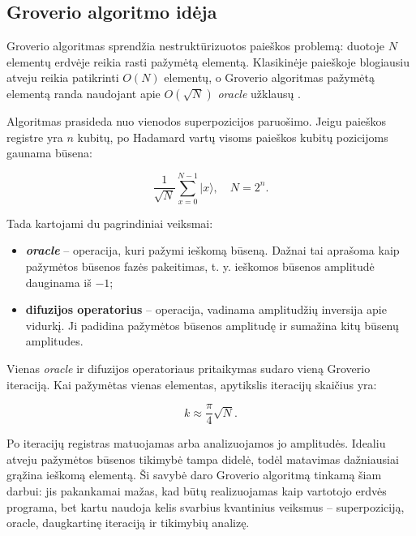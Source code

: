 \subsection{Groverio algoritmo idėja}
\label{sec:groverio-algoritmo-ideja}

Groverio algoritmas sprendžia nestruktūrizuotos paieškos problemą: duotoje $N$ elementų erdvėje reikia rasti pažymėtą elementą. Klasikinėje paieškoje blogiausiu atveju reikia patikrinti $O(N)$ elementų, o Groverio algoritmas pažymėtą elementą randa naudojant apie $O(\sqrt{N})$ \textit{oracle} užklausų \cite{grover-1996,nielsen-chuang-2010}.

Algoritmas prasideda nuo vienodos superpozicijos paruošimo. Jeigu paieškos registre yra $n$ kubitų, po Hadamard vartų visoms paieškos kubitų pozicijoms gaunama būsena:

\begin{equation}
    \frac{1}{\sqrt{N}} \sum_{x=0}^{N-1} \lvert x \rangle,
    \quad N = 2^n.
\end{equation}

Tada kartojami du pagrindiniai veiksmai:

\begin{itemize}
    \item \textbf{\textit{oracle}} -- operacija, kuri pažymi ieškomą būseną. Dažnai tai aprašoma kaip pažymėtos būsenos fazės pakeitimas, t. y. ieškomos būsenos amplitudė dauginama iš $-1$;
    \item \textbf{difuzijos operatorius} -- operacija, vadinama amplitudžių inversija apie vidurkį. Ji padidina pažymėtos būsenos amplitudę ir sumažina kitų būsenų amplitudes.
\end{itemize}

Vienas \textit{oracle} ir difuzijos operatoriaus pritaikymas sudaro vieną Groverio iteraciją. Kai pažymėtas vienas elementas, apytikslis iteracijų skaičius yra:

\begin{equation}
    k \approx \frac{\pi}{4}\sqrt{N}.
\end{equation}

Po iteracijų registras matuojamas arba analizuojamos jo amplitudės. Idealiu atveju pažymėtos būsenos tikimybė tampa didelė, todėl matavimas dažniausiai grąžina ieškomą elementą. Ši savybė daro Groverio algoritmą tinkamą šiam darbui: jis pakankamai mažas, kad būtų realizuojamas kaip vartotojo erdvės programa, bet kartu naudoja kelis svarbius kvantinius veiksmus -- superpoziciją, oracle, daugkartinę iteraciją ir tikimybių analizę.
